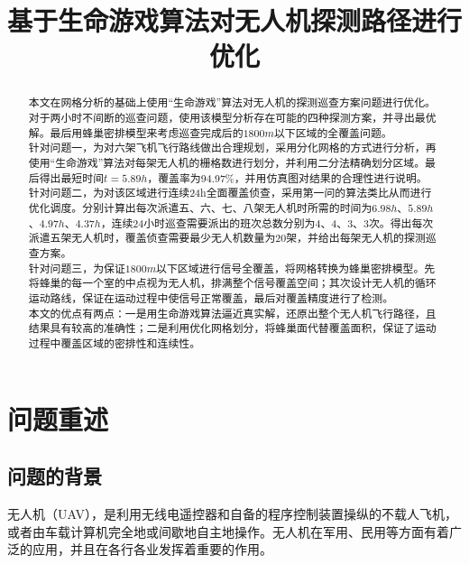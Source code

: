 \documentclass{whutmod}
\title{基于生命游戏算法对无人机探测路径进行优化}
\begin{document}
	
	\maketitle
	
	\begin{abstract}
   本文在网格分析的基础上使用“生命游戏”算法对无人机的探测巡查方案问题进行优化。对于两小时不间断的巡查问题，使用该模型分析存在可能的四种探测方案，并寻出最优解。最后用蜂巢密排模型来考虑巡查完成后的$1800m$以下区域的全覆盖问题。
   ~\\
   
   针对问题一，为对六架飞机飞行路线做出合理规划，采用分化网格的方式进行分析，再使用“生命游戏”算法对每架无人机的栅格数进行划分，并利用二分法精确划分区域。最后得出最短时间$t=5.89h$，覆盖率为94.97\%，并用仿真图对结果的合理性进行说明。
   ~\\
   
   针对问题二，为对该区域进行连续24h全面覆盖侦查，采用第一问的算法类比从而进行优化调度。分别计算出每次派遣五、六、七、八架无人机时所需的时间为$6.98h$、$5.89h$、$4.97h$、$4.37h$，连续24小时巡查需要派出的班次总数分别为4、4、3、3次。得出每次派遣五架无人机时，覆盖侦查需要最少无人机数量为$20$架，并给出每架无人机的探测巡查方案。
   ~\\
   
   针对问题三，为保证$1800m$以下区域进行信号全覆盖，将网格转换为蜂巢密排模型。先将蜂巢的每一个室的中点视为无人机，排满整个信号覆盖空间；其次设计无人机的循环运动路线，保证在运动过程中使信号正常覆盖，最后对覆盖精度进行了检测。
   ~\\
   
   本文的优点有两点：一是用生命游戏算法逼近真实解，还原出整个无人机飞行路径，且结果具有较高的准确性；二是利用优化网格划分，将蜂巢面代替覆盖面积，保证了运动过程中覆盖区域的密排性和连续性。
  
		
	\end{abstract}
	
	\tableofcontents
	\newpage	%
	
	\section{问题重述}
	\subsection{问题的背景}

	无人机（UAV），是利用无线电遥控器和自备的程序控制装置操纵的不载人飞机，或者由车载计算机完全地或间歇地自主地操作。无人机在军用、民用等方面有着广泛的应用，并且在各行各业发挥着重要的作用。
	
\end{document}
